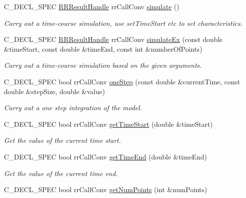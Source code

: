 \begin{DoxyCompactItemize}
\-C\-\_\-\-D\-E\-C\-L\-\_\-\-S\-P\-E\-C \hyperlink{rr__c__types_8h_a8c364bbdef9aab31c89655c38461da51}{\-R\-R\-Result\-Handle} \*
rr\-Call\-Conv \hyperlink{group__loadsave_ga9f0555c11716daec2336d54d13facc57}{simulate} ()
\begin{DoxyCompactList}\small\item\em \-Carry out a time-\/course simulation, use set\-Time\-Start etc to set characteristics. \end{DoxyCompactList}\item 
\-C\-\_\-\-D\-E\-C\-L\-\_\-\-S\-P\-E\-C \hyperlink{rr__c__types_8h_a8c364bbdef9aab31c89655c38461da51}{\-R\-R\-Result\-Handle} \*
rr\-Call\-Conv \hyperlink{group__loadsave_ga9b87919e79f6eb0d7c77c3daa08d6baf}{simulate\-Ex} (const double \&time\-Start, const double \&time\-End, const int \&number\-Of\-Points)
\begin{DoxyCompactList}\small\item\em \-Carry out a time-\/course simulation based on the given arguments. \end{DoxyCompactList}\item 
\-C\-\_\-\-D\-E\-C\-L\-\_\-\-S\-P\-E\-C bool rr\-Call\-Conv \hyperlink{group__loadsave_ga190fff177accdfbc9c192c4993807e2e}{one\-Step} (const double \&current\-Time, const double \&step\-Size, double \&value)
\begin{DoxyCompactList}\small\item\em \-Carry out a one step integration of the model. \end{DoxyCompactList}\item 
\-C\-\_\-\-D\-E\-C\-L\-\_\-\-S\-P\-E\-C bool rr\-Call\-Conv \hyperlink{group__loadsave_ga18b4fbd0dc5aa3f25d58367a406f425c}{get\-Time\-Start} (double \&time\-Start)
\begin{DoxyCompactList}\small\item\em \-Get the value of the current time start. \end{DoxyCompactList}\item 
\-C\-\_\-\-D\-E\-C\-L\-\_\-\-S\-P\-E\-C bool rr\-Call\-Conv \hyperlink{group__loadsave_ga451e7ecddd0431316048a332410b0600}{get\-Time\-End} (double \&time\-End)
\begin{DoxyCompactList}\small\item\em \-Get the value of the current time end. \end{DoxyCompactList}\item 
\-C\-\_\-\-D\-E\-C\-L\-\_\-\-S\-P\-E\-C bool rr\-Call\-Conv \hyperlink{group__loadsave_gacd9cb734773710f640742a9f040dccc5}{get\-Num\-Points} (int \&num\-Points)

\end{DoxyCompactItemize}
